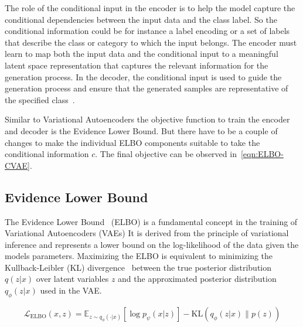 The role of the conditional input in the encoder is to help the model capture the conditional dependencies between the input data and the class label. So the conditional information could be for instance a label encoding or a set of labels that describe the class or category to which the input belongs. The encoder must learn to map both the input data and the conditional input to a meaningful latent space representation that captures the relevant information for the generation process. In the decoder, the conditional input is used to guide the generation process and ensure that the generated samples are representative of the specified class~\cite{CVAE}.

Similar to Variational Autoencoders the objective function to train the encoder and decoder is the Evidence Lower Bound. But there have to be a couple of changes to make the individual ELBO components suitable to take the conditional information $c$. The final objective can be observed in~\eqref{eqn:ELBO-CVAE}.

\subsection{Evidence Lower Bound}\label{sec:ELBO}

The Evidence Lower Bound~\cite{pml2Book} (ELBO) is a fundamental concept in the training of Variational Autoencoders (VAEs)
It is derived from the principle of variational inference and represents a lower bound on the log-likelihood of the data given the models parameters. Maximizing the ELBO is equivalent to minimizing the Kullback-Leibler (KL) divergence~\cite{pml2Book} between the true posterior distribution $q(z|x)$ over latent variables $z$ and the approximated posterior distribution $q_\phi(z|x)$ used in the VAE.

\begin{equation}\label{eqn:ELBO}
	\mathcal{L}_\text{ELBO}(x, z) = \mathbb{E}_{z\sim q_\phi(\cdot|x)} \left[ \log p_\psi(x|z) \right] - \text{KL}\left( q_\phi(z|x) \| p(z) \right)
\end{equation}

